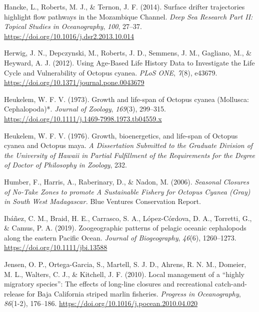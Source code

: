 \documentclass[
]{article}
\newlength{\cslhangindent}
\newlength{\cslentryspacingunit} %
\newenvironment{CSLReferences}[2] %
 {%
  \setlength{\parindent}{0pt}
  \ifodd #1
  \let\oldpar\par
  \def\par{\hangindent=\cslhangindent\oldpar}
  \fi
  \setlength{\parskip}{#2\cslentryspacingunit}
 }%
 {}
\begin{document}
\begin{CSLReferences}{1}{2}
\leavevmode{}%
Hancke, L., Roberts, M. J., \& Ternon, J. F. (2014). Surface drifter trajectories highlight flow pathways in the {Mozambique Channel}. \emph{Deep Sea Research Part II: Topical Studies in Oceanography}, \emph{100}, 27--37. \url{https://doi.org/10.1016/j.dsr2.2013.10.014}

\leavevmode{}%
Herwig, J. N., Depczynski, M., Roberts, J. D., Semmens, J. M., Gagliano, M., \& Heyward, A. J. (2012). Using {Age-Based Life History Data} to {Investigate} the {Life Cycle} and {Vulnerability} of {Octopus} cyanea. \emph{PLoS ONE}, \emph{7}(8), e43679. \url{https://doi.org/10.1371/journal.pone.0043679}

\leavevmode{}%
Heukelem, W. F. V. (1973). Growth and life-span of {Octopus} cyanea ({Mollusca}: {Cephalopoda})*. \emph{Journal of Zoology}, \emph{169}(3), 299--315. \url{https://doi.org/10.1111/j.1469-7998.1973.tb04559.x}

\leavevmode{}%
Heukelem, W. F. V. (1976). Growth, bioenergetics, and life-span of {Octopus} cyanea and {Octopus} maya. \emph{A Dissertation Submitted to the Graduate Division of the University of Hawaii in Partial Fulfillment of the Requirements for the Degree of Doctor of Philosophy in Zoology}, 232.

\leavevmode{}%
Humber, F., Harris, A., Raberinary, D., \& Nadon, M. (2006). \emph{Seasonal {Closures} of {No-Take Zones} to promote {A Sustainable Fishery} for {Octopus Cyanea} ({Gray}) in {South West Madagascar}.} Blue Ventures Conservation Report.

\leavevmode{}%
Ibáñez, C. M., Braid, H. E., Carrasco, S. A., López-Córdova, D. A., Torretti, G., \& Camus, P. A. (2019). Zoogeographic patterns of pelagic oceanic cephalopods along the eastern {Pacific Ocean}. \emph{Journal of Biogeography}, \emph{46}(6), 1260--1273. \url{https://doi.org/10.1111/jbi.13588}

\leavevmode{}%
Jensen, O. P., Ortega-Garcia, S., Martell, S. J. D., Ahrens, R. N. M., Domeier, M. L., Walters, C. J., \& Kitchell, J. F. (2010). Local management of a {``highly migratory species''}: {The} effects of long-line closures and recreational catch-and-release for {Baja California} striped marlin fisheries. \emph{Progress in Oceanography}, \emph{86}(1-2), 176--186. \url{https://doi.org/10.1016/j.pocean.2010.04.020}


\end{CSLReferences}
\end{document}
